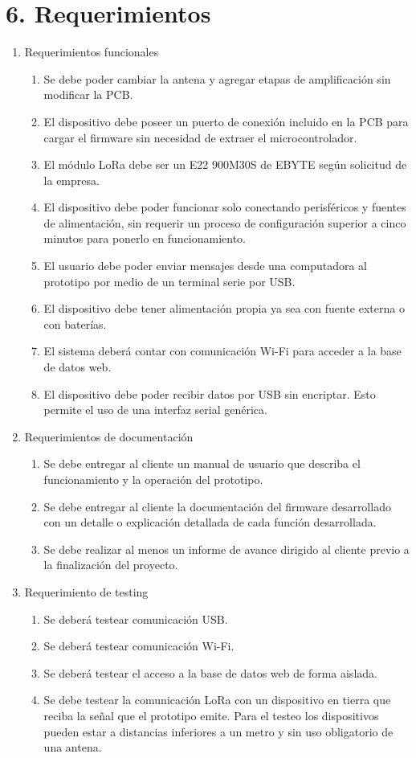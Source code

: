 \documentclass[
11pt, %
codirector, %
]{charter}
\begin{document}
\section{6. Requerimientos}
\label{sec:requerimientos}

\begin{enumerate}
	\item Requerimientos funcionales
		\begin{enumerate}
			\item Se debe poder cambiar la antena y agregar etapas de amplificación sin modificar la PCB.
			\item El dispositivo debe poseer un puerto de conexión incluido en la PCB para cargar el firmware sin necesidad de extraer el microcontrolador.
			\item El módulo LoRa debe ser un E22 900M30S de EBYTE según solicitud de la empresa.
			\item El dispositivo debe poder funcionar solo conectando perisféricos y fuentes de alimentación, sin requerir un proceso de configuración superior a cinco minutos para ponerlo en funcionamiento.
			\item El usuario debe poder enviar mensajes desde una computadora al prototipo por medio de un terminal serie por USB.
			\item El dispositivo debe tener alimentación propia ya sea con fuente externa o con baterías.
			\item El sistema deberá contar con comunicación Wi-Fi para acceder a la base de datos web.
			\item El dispositivo debe poder recibir datos por USB sin encriptar. Esto permite el uso de una interfaz serial genérica.
		\end{enumerate}
	\item Requerimientos de documentación
		\begin{enumerate}
			\item Se debe entregar al cliente un manual de usuario que describa el funcionamiento y la operación del prototipo.
			\item Se debe entregar al cliente la documentación del firmware desarrollado con un detalle o  explicación detallada de cada función desarrollada.
			\item Se debe realizar al menos un informe de avance dirigido al cliente previo a la finalización del proyecto.
		\end{enumerate}
	\item Requerimiento de testing
		\begin{enumerate}
			\item Se deberá testear comunicación USB.
			\item Se deberá testear comunicación Wi-Fi.
			\item Se deberá testear el acceso a la base de datos web de forma aislada.
			\item Se debe testear la comunicación LoRa con un dispositivo en tierra que reciba la señal que el prototipo emite. Para el testeo los dispositivos pueden estar a distancias inferiores a un metro y sin uso obligatorio de una antena.
		\end{enumerate}
\end{enumerate}
\end{document}
